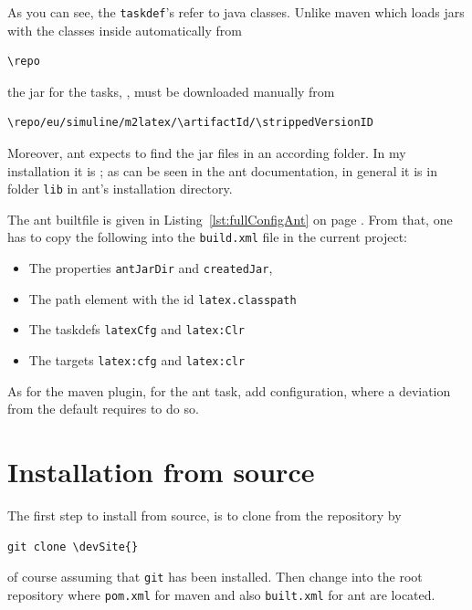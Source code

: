 \documentclass[12pt]{book}
\renewcommand{\index}[1]{ }
\begin{document}
As you can see, the \texttt{taskdef}'s refer to java classes.
Unlike maven which loads jars with the classes inside automatically
from
% 
\begin{Verbatim}[fontsize=\small, commandchars=\\\{\}]
\repo
\end{Verbatim}
%
the jar for the tasks, \createdJar,
must be downloaded manually from
%
\begin{Verbatim}[fontsize=\scriptsize, commandchars=\\\{\}]
\repo/eu/simuline/m2latex/\artifactId/\strippedVersionID
\end{Verbatim}
%
Moreover, ant expects to find the jar files in an according folder.
In my installation it is \antJarDir;
as can be seen in the ant documentation,
in general it is in folder \texttt{lib} in ant's installation directory. 

The ant builtfile is given in Listing~\ref{lst:fullConfigAnt}
on page \pageref{lst:fullConfigAnt}.
From that, one has to copy the following
into the \texttt{build.xml} file in the current project:
%
\begin{itemize}
\item The properties \texttt{antJarDir} and \texttt{createdJar}, 
\item The path element with the id \texttt{latex.classpath}
\item The taskdefs \texttt{latexCfg}  and \texttt{latex:Clr}
\item The  targets \texttt{latex:cfg} and \texttt{latex:clr}
\end{itemize}
\index{ant-task}

As for the maven plugin, for the ant task, add configuration, 
where a deviation from the default requires to do so. 



\section{Installation from source}\label{sec:instSrc}

The first step to install from source, is to clone from the repository by
%
\begin{Verbatim}[commandchars=\\\{\}]
git clone \devSite{}
\end{Verbatim}
%
of course assuming that \texttt{git} has been installed.
Then change into the root repository where \texttt{pom.xml}
for maven and also \texttt{built.xml} for ant are located. 
\end{document}
